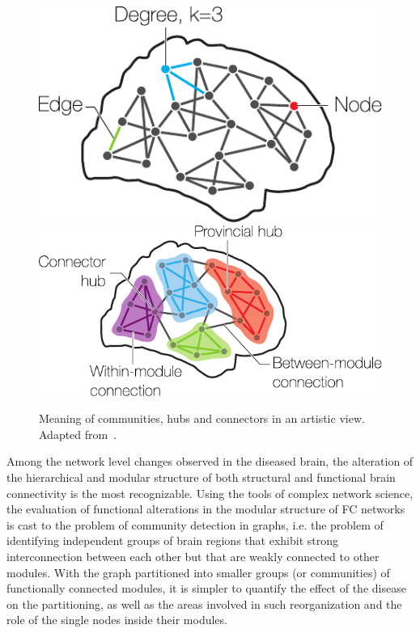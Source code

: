 \begin{figure}[htb!]
\centering
\hfill\includegraphics[height=0.25\textwidth]{images/brain_network_basics.pdf}\hfill
\includegraphics[height=0.25\textwidth]{images/brain_network_communities.pdf}\hfill
\caption{Meaning of communities, hubs and connectors in an artistic view. Adapted from~\cite{sporns2016}.}
\label{fig:brain_network_communities}
\end{figure}



%

Among the network level changes observed in the diseased brain, the alteration of the hierarchical and modular structure of both structural and functional brain connectivity is the most recognizable. Using the tools of complex network science, the evaluation of functional alterations in the modular structure of FC networks is cast to the problem of community detection in graphs, i.e. the problem of identifying independent groups of brain regions that exhibit strong interconnection between each other but that are weakly connected to other modules.
With the graph partitioned into smaller groups (or communities) of functionally connected modules, it is simpler to quantify the effect of the disease on the partitioning, as well as the areas involved in such reorganization and the role of the single nodes inside their modules.


